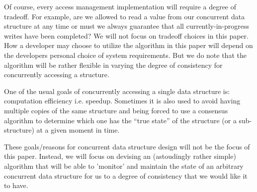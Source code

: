 Of course, every access management implementation will require a degree of tradeoff. For example, are we allowed to read a value from our concurrent data structure at any time or must we always guarantee that all currently-in-progress writes have been completed? We will not focus on tradeoff choices in this paper. How a developer may choose to utilize the algorithm in this paper will depend on the developers personal choice of system requirements. But we do note that the algorithm will be rather flexible in varying the degree of consistency for concurrently accessing a structure.

One of the usual goals of concurrently accessing a single data structure is: computation efficiency i.e. speedup. Sometimes it is also used to avoid having multiple copies of the same structure and being forced to use a consensus algorithm to determine which one has the ``true state'' of the structure (or a sub-structure) at a given moment in time.

These goals/reasons for concurrent data structure design will not be the focus of this paper. Instead, we will focus on devising an (astoudingly rather simple) algorithm that will be able to 'monitor' and maintain the state of an arbitrary concurrent data structure for us to a degree of consistency that we would like it to have.




